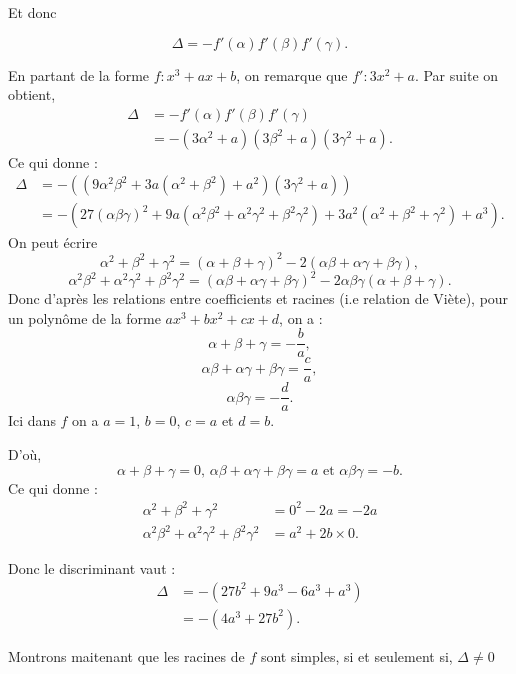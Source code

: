 \begin{demonstration}[Lemme]
Et donc 

\[
\Delta = - f'(\alpha) f'(\beta ) f'(\gamma)
.\] 

En partant de la forme $f : x^3 + ax + b$, on remarque que $f' : 3x^2 + a$. Par suite on obtient,
\begin{align*}
    \Delta &= - f'(\alpha) f'(\beta ) f'(\gamma) \\
      &= - \left( 3 \alpha^2 + a \right) \left( 3 \beta^2 + a \right) \left( 3 \gamma^2 + a \right) 
.\end{align*}
Ce qui donne :
\begin{align*}
    \Delta  &= - \left( ( 9 \alpha^2 \beta^2 + 3a ( \alpha^2 + \beta^2 ) + a^2 ) ( 3 \gamma^2 + a ) \right)  \\
       &= - \left( 27 \left( \alpha \beta \gamma \right)^2  + 9a \left( \alpha^2 \beta^2 + \alpha^2 \gamma^2 + \beta^2 \gamma^2 \right) + 3a^2 \left( \alpha^2 + \beta^2 + \gamma^2 \right) + a^3 \right) 
.\end{align*}
On peut écrire
\[
\alpha^2 + \beta^2 + \gamma^2 = \left( \alpha + \beta + \gamma \right)^2 - 2 \left( \alpha \beta + \alpha \gamma + \beta \gamma \right)
,\] 
\[
\alpha^2 \beta^2 + \alpha^2 \gamma^2 + \beta^2 \gamma^2 = \left( \alpha \beta + \alpha \gamma + \beta \gamma \right)^2 - 2\alpha \beta \gamma \left( \alpha + \beta + \gamma \right)
.\] 
Donc d'après les relations entre coefficients et racines (i.e relation de Viète), pour un polynôme de la forme $ax^3 + bx^2 + cx + d$, on a :
\[
\alpha + \beta + \gamma = - \frac{b}{a}
,\] 
\[
\alpha \beta + \alpha \gamma + \beta \gamma = \frac{c}{a}
,\] 
\[
\alpha \beta \gamma = - \frac{d}{a}
.\] 
Ici dans $f$ on a $a = 1$, $b = 0$, $c = a$ et $d = b$.

D'où,
\[
\alpha + \beta + \gamma = 0 \text{, } \alpha \beta + \alpha \gamma + \beta \gamma = a \text{ et } \alpha \beta \gamma = - b
.\] 
Ce qui donne : 
\begin{align*}
    \alpha^2 + \beta^2 + \gamma^2 &= 0^2 - 2a = -2a \\
    \alpha^2 \beta^2 + \alpha^2 \gamma^2 + \beta^2 \gamma^2 &= a^2 + 2b \times 0
.\end{align*}

Donc le discriminant vaut :
\begin{align*}
    \Delta &= - \left( 27b^2 + 9a^3 - 6a^3 + a^3  \right) \\
        &= - \left( 4a^3 + 27b^2  \right)
.\end{align*}

Montrons maitenant que les racines de $f$ sont simples, si et seulement si, $\Delta \neq 0$


\end{demonstration}
